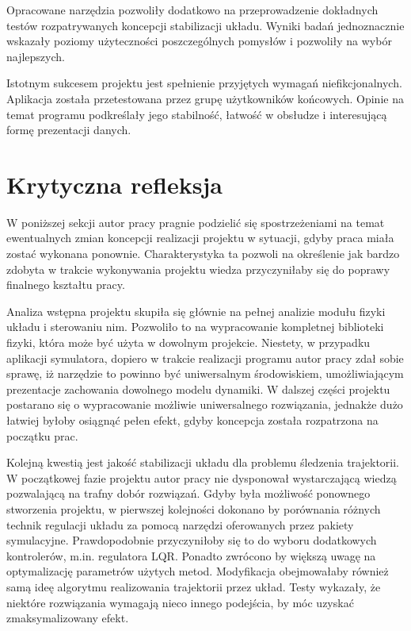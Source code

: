 \documentclass[12pt, twoside, openany]{report}
\theoremstyle{definition}
\begin{document}
Opracowane narzędzia pozwoliły dodatkowo na przeprowadzenie dokładnych testów rozpatrywanych koncepcji stabilizacji układu. Wyniki badań jednoznacznie wskazały poziomy użyteczności poszczególnych pomysłów i pozwoliły na wybór najlepszych.

Istotnym sukcesem projektu jest spełnienie przyjętych wymagań niefikcjonalnych. Aplikacja została przetestowana przez grupę użytkowników końcowych. Opinie na temat programu podkreślały jego stabilność, łatwość w obsłudze i interesującą formę prezentacji danych.

\section{Krytyczna refleksja}
W poniższej sekcji autor pracy pragnie podzielić się spostrzeżeniami na temat ewentualnych zmian koncepcji realizacji projektu w sytuacji, gdyby praca miała zostać wykonana ponownie. Charakterystyka ta pozwoli na określenie jak bardzo zdobyta w trakcie wykonywania projektu wiedza przyczyniłaby się do poprawy finalnego kształtu pracy. 

Analiza wstępna projektu skupiła się głównie na pełnej analizie modułu fizyki układu i sterowaniu nim. Pozwoliło to na wypracowanie kompletnej biblioteki fizyki, która może być użyta w dowolnym projekcie. Niestety, w przypadku aplikacji symulatora, dopiero w trakcie realizacji programu autor pracy zdał sobie sprawę, iż narzędzie to powinno być uniwersalnym środowiskiem, umożliwiającym prezentacje zachowania dowolnego modelu dynamiki. W dalszej części projektu postarano się o wypracowanie możliwie uniwersalnego rozwiązania, jednakże dużo łatwiej byłoby osiągnąć pełen efekt, gdyby koncepcja została rozpatrzona na początku prac. 

Kolejną kwestią jest jakość stabilizacji układu dla problemu śledzenia trajektorii. W początkowej fazie projektu autor pracy nie dysponował wystarczającą wiedzą pozwalającą na trafny dobór rozwiązań. Gdyby była możliwość ponownego stworzenia projektu, w pierwszej kolejności dokonano by porównania różnych technik regulacji układu za pomocą narzędzi oferowanych przez pakiety symulacyjne. Prawdopodobnie przyczyniłoby się to do wyboru dodatkowych kontrolerów, m.in. regulatora LQR. Ponadto zwrócono by większą uwagę na optymalizację parametrów użytych metod. Modyfikacja obejmowałaby również samą ideę algorytmu realizowania trajektorii przez układ. Testy wykazały, że niektóre rozwiązania wymagają nieco innego podejścia, by móc uzyskać zmaksymalizowany efekt. 
\end{document}
